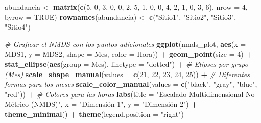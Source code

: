 \documentclass[
]{article}
\newenvironment{Shaded}{\begin{snugshade}}{\end{snugshade}}
\newcommand{\AttributeTok}[1]{\textcolor[rgb]{0.13,0.29,0.53}{#1}}
\newcommand{\CommentTok}[1]{\textcolor[rgb]{0.56,0.35,0.01}{\textit{#1}}}
\newcommand{\ConstantTok}[1]{\textcolor[rgb]{0.56,0.35,0.01}{#1}}
\newcommand{\DecValTok}[1]{\textcolor[rgb]{0.00,0.00,0.81}{#1}}
\newcommand{\FunctionTok}[1]{\textcolor[rgb]{0.13,0.29,0.53}{\textbf{#1}}}
\newcommand{\NormalTok}[1]{#1}
\newcommand{\OtherTok}[1]{\textcolor[rgb]{0.56,0.35,0.01}{#1}}
\newcommand{\SpecialCharTok}[1]{\textcolor[rgb]{0.81,0.36,0.00}{\textbf{#1}}}
\newcommand{\StringTok}[1]{\textcolor[rgb]{0.31,0.60,0.02}{#1}}
\begin{document}
\begin{Shaded}
\begin{Highlighting}[]
\NormalTok{abundancia }\OtherTok{\textless{}{-}} \FunctionTok{matrix}\NormalTok{(}\FunctionTok{c}\NormalTok{(}\DecValTok{5}\NormalTok{, }\DecValTok{0}\NormalTok{, }\DecValTok{3}\NormalTok{, }\DecValTok{0}\NormalTok{, }\DecValTok{0}\NormalTok{, }\DecValTok{2}\NormalTok{, }\DecValTok{5}\NormalTok{, }\DecValTok{1}\NormalTok{, }\DecValTok{0}\NormalTok{, }\DecValTok{0}\NormalTok{, }\DecValTok{4}\NormalTok{, }\DecValTok{2}\NormalTok{, }\DecValTok{1}\NormalTok{, }\DecValTok{0}\NormalTok{, }\DecValTok{3}\NormalTok{, }\DecValTok{6}\NormalTok{), }
                     \AttributeTok{nrow =} \DecValTok{4}\NormalTok{, }\AttributeTok{byrow =} \ConstantTok{TRUE}\NormalTok{)}
\FunctionTok{rownames}\NormalTok{(abundancia) }\OtherTok{\textless{}{-}} \FunctionTok{c}\NormalTok{(}\StringTok{"Sitio1"}\NormalTok{, }\StringTok{"Sitio2"}\NormalTok{, }\StringTok{"Sitio3"}\NormalTok{, }\StringTok{"Sitio4"}\NormalTok{)}
\end{Highlighting}
\end{Shaded}

\begin{Shaded}
\begin{Highlighting}[]
\CommentTok{\# Graficar el NMDS con los puntos adicionales}
\FunctionTok{ggplot}\NormalTok{(nmds\_plot, }\FunctionTok{aes}\NormalTok{(}\AttributeTok{x =}\NormalTok{ MDS1, }\AttributeTok{y =}\NormalTok{ MDS2, }\AttributeTok{shape =}\NormalTok{ Mes, }\AttributeTok{color =}\NormalTok{ Hora)) }\SpecialCharTok{+}
  \FunctionTok{geom\_point}\NormalTok{(}\AttributeTok{size =} \DecValTok{4}\NormalTok{) }\SpecialCharTok{+} 
  \FunctionTok{stat\_ellipse}\NormalTok{(}\FunctionTok{aes}\NormalTok{(}\AttributeTok{group =}\NormalTok{ Mes), }\AttributeTok{linetype =} \StringTok{"dotted"}\NormalTok{) }\SpecialCharTok{+}  \CommentTok{\# Elipses por grupo (Mes)}
  \FunctionTok{scale\_shape\_manual}\NormalTok{(}\AttributeTok{values =} \FunctionTok{c}\NormalTok{(}\DecValTok{21}\NormalTok{, }\DecValTok{22}\NormalTok{, }\DecValTok{23}\NormalTok{, }\DecValTok{24}\NormalTok{, }\DecValTok{25}\NormalTok{)) }\SpecialCharTok{+}  \CommentTok{\# Diferentes formas para los meses}
  \FunctionTok{scale\_color\_manual}\NormalTok{(}\AttributeTok{values =} \FunctionTok{c}\NormalTok{(}\StringTok{"black"}\NormalTok{, }\StringTok{"gray"}\NormalTok{, }\StringTok{"blue"}\NormalTok{, }\StringTok{"red"}\NormalTok{)) }\SpecialCharTok{+}  \CommentTok{\# Colores para las horas}
  \FunctionTok{labs}\NormalTok{(}\AttributeTok{title =} \StringTok{"Escalado Multidimensional No{-}Métrico (NMDS)"}\NormalTok{, }
       \AttributeTok{x =} \StringTok{"Dimensión 1"}\NormalTok{, }\AttributeTok{y =} \StringTok{"Dimensión 2"}\NormalTok{) }\SpecialCharTok{+}
  \FunctionTok{theme\_minimal}\NormalTok{() }\SpecialCharTok{+}
  \FunctionTok{theme}\NormalTok{(}\AttributeTok{legend.position =} \StringTok{"right"}\NormalTok{)}
\end{Highlighting}
\end{Shaded}
\end{document}
